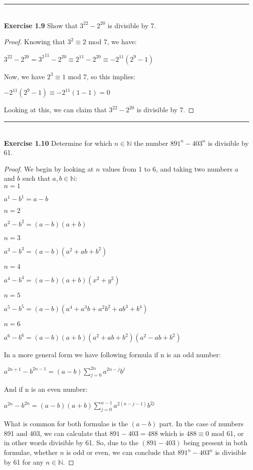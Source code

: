 \documentclass{article}
\begin{document}
\noindent\rule{12cm}{0.4pt}\\
\noindent \textbf{Exercise 1.9} Show that $3^{22}-2^{20}$ is divisible by 7.
\begin{proof}
Knowing that $3^2 \equiv 2$ mod 7, we have: \\
\begin{center}
	$3^{22}-2^{20} = {3^{2}}^{11}-2^{20} \equiv 2^{11} - 2^{20} \equiv {-2}^{11}(2^9-1)$
\end{center}
Now, we have $2^3 \equiv 1$ mod 7, so this implies:
 \begin{center}
	${-2}^{11}(2^9-1) \equiv {-2}^{11}(1-1) = 0$
\end{center}
Looking at this, we can claim that $3^{22}-2^{20}$ is divisible by 7.
\end{proof}



\noindent\rule{12cm}{0.4pt}\\
\noindent \textbf{Exercise 1.10} Determine for which $n \in \mathbb{N}$ the number $891^n - 403^n$ is divisible by 61.
\begin{proof}
We begin by looking at $n$ values from 1 to 6, and taking two numbers $a$ and $b$ such that $a, b \in \mathbb{N}$: \\
$n=1$
\begin{center}
	$a^1 - b^1 = a - b$
\end{center}
$n=2$
\begin{center}
	$a^2 - b^2 = (a - b)(a + b)$
\end{center}
$n=3$
\begin{center}
	$a^3 - b^3 = (a - b)(a^2 + ab + b^2)$
\end{center}
$n=4$
\begin{center}
	$a^4 - b^4 = (a - b)(a + b)(x^2 + y^2)$
\end{center}
$n=5$
\begin{center}
	$a^5 - b^5 = (a - b)(a^4 + a^{3}b + a^{2}b^{2} + ab^{3} + b^{4})$
\end{center}
$n=6$
\begin{center}
	$a^6 - b^6 = (a - b)(a + b)(a^2 + ab + b^2)(a^2 - ab + b^2)$
\end{center}
In a more general form we have following formula if n is an odd number: 
\begin{center}
	$a^{2n+1} - b^{2n-1} = (a - b)\sum_{j=0}^{2n}a^{2n-j}b^j$
\end{center}
\noindent And if n is an even number:
\begin{center}
	$a^{2n} - b^{2n} = (a - b)(a + b)\sum_{j=0}^{n-1}a^{2(n-j-1)}b^{2j}$
\end{center}
What is common for both formulae is the $(a - b)$ part. In the case of numbers 891 and 403, we can calculate that $891-403=488$ which is $488 \equiv 0$ mod 61, or in other words divisible by 61. So, due to the $(891-403)$ being present in both formulae, whether $n$ is odd or even, we can conclude that $891^n - 403^n$ is divisible by 61 for any $n \in \mathbb{N}$.
\end{proof}
\end{document}
